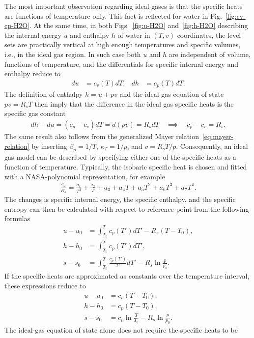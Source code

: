 The most important observation regarding ideal gases is that the specific heats are functions of temperature only. This fact is reflected for water in Fig.~\ref{fig:cv-cp-H2O}. At the same time, in both Figs.~\ref{fig:u-H2O} and~\ref{fig:h-H2O} describing the internal energy $u$ and enthalpy $h$ of water in $(T,v)$ coordinates, the level sets are practically vertical at high enough temperatures and specific volumes, i.e., in the ideal gas region. In such case both $u$ and $h$ are independent of volume, functions of temperature, and the differentials for specific internal energy and enthalpy reduce to 
\begin{align}
    du&=c_v(T)dT, & dh&=c_p(T)dT.
\end{align}
The definition of enthalpy $h=u+pv$ and the ideal gas equation of state $pv=R_sT$ then imply that the difference in the ideal gas specific heats is the specific gas constant
\begin{align}
    dh-du=(c_p-c_v)dT=d(pv)=R_sdT \quad \implies \quad c_p-c_v=R_s.
\end{align}
The same result also follows from the generalized Mayer relation~\eqref{eq:mayer-relation} by inserting
$\beta_p=1/T$, $\kappa_T=1/p$, and $v=R_sT/p$. Consequently, an ideal gas model can be described by specifying either one of the specific heats as a function of temperature. Typically, the isobaric specific heat is chosen and fitted with a NASA-polynomial
representation, for example
\begin{align}
    \frac{c_p}{R_s}=\frac{a_1}{T^2}+\frac{a_2}{T}+a_3+a_4T+a_5T^2+a_6T^3+a_7T^4.
\end{align}
The changes is specific internal energy, the specific enthalpy, and the specific entropy can then be calculated with respect to reference point from the following formulas 
\begin{align}
    u-u_0&=\int_{T_0}^{T}c_p(T')dT'-R_s(T-T_0),\\
    h-h_0&=\int_{T_0}^{T}c_p(T')dT',\\
    s-s_0&=\int_{T_0}^{T}\frac{c_p(T')}{T'}dT'-R_s\ln\frac{p}{p_0}.
\end{align}
If the specific heats are approximated as constants over the temperature interval,
these expressions reduce to
\begin{align}
    u-u_0&=c_v(T-T_0),\\
    h-h_0&=c_p(T-T_0),\\
    s-s_0&=c_p\ln\frac{T}{T_0}-R_s\ln\frac{p}{p_0}.
\end{align}
The ideal-gas equation of state alone does not require the specific heats to be
